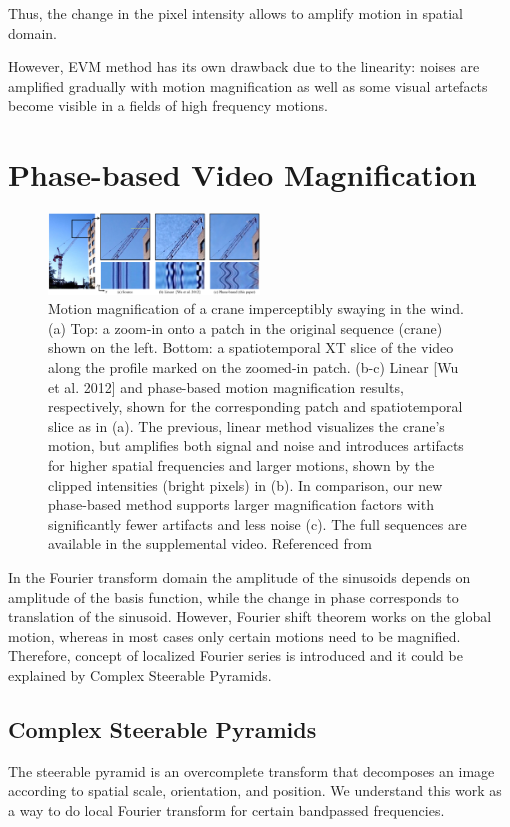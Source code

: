 \documentclass{IEEEtran}
\begin{document}
Thus, the change in the pixel intensity allows to amplify motion in spatial domain.

However, EVM method has its own drawback due to the linearity: noises are amplified gradually with motion magnification as well as some visual artefacts become visible in a fields of high frequency motions.

\section{Phase-based Video Magnification}

\begin{figure}[h]
	\centering
	\includegraphics[width=0.5\textwidth]{phase-based}
	\caption{Motion magnification of a crane imperceptibly swaying in the wind. (a) Top: a zoom-in onto a patch in the original sequence (crane) shown on the left. Bottom: a spatiotemporal XT slice of the video along the profile marked on the zoomed-in patch. (b-c) Linear [Wu et al. 2012] and phase-based motion magnification results, respectively, shown for the corresponding patch and spatiotemporal slice as in (a). The previous, linear method visualizes the crane’s motion, but amplifies both signal and noise and introduces artifacts for higher spatial frequencies and larger motions, shown by the clipped intensities (bright pixels) in (b). In comparison, our new phase-based method supports larger magnification factors with significantly fewer artifacts and less noise (c). The full sequences are available in the supplemental video. Referenced from \cite{Wadhwa:2013:PVM:2461912.2461966}}
	\label{fig:phase-based}
\end{figure}

In the Fourier transform domain the amplitude of the sinusoids depends on amplitude of the basis function, while the change in phase corresponds to translation of the sinusoid. However, Fourier shift theorem works on the global motion, whereas in most cases only certain motions need to be magnified. Therefore, concept of localized Fourier series is introduced and it could be explained by Complex Steerable Pyramids.

\subsection{Complex Steerable Pyramids}
The steerable pyramid \cite{119725} is an overcomplete transform that decomposes an image according to spatial scale, orientation, and position. We understand this work as a way to do local Fourier transform for certain bandpassed frequencies.
\end{document}
